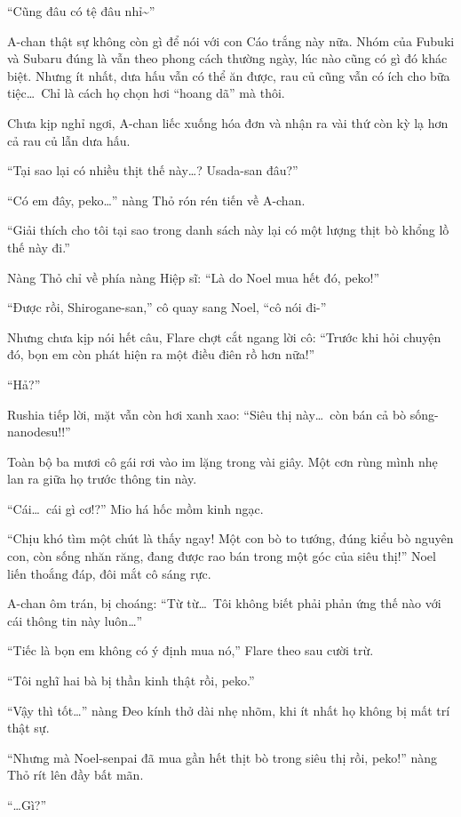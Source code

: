 \documentclass[../main.tex]{subfiles}
\begin{document}
``Cũng đâu có tệ đâu nhỉ\~{}''

A-chan thật sự không còn gì để nói với con Cáo trắng này nữa. Nhóm của Fubuki và Subaru đúng là vẫn theo phong cách thường ngày, lúc nào cũng có gì đó khác biệt. Nhưng ít nhất, dưa hấu vẫn có thể ăn được, rau củ cũng vẫn có ích cho bữa tiệc\dots\ Chỉ là cách họ chọn hơi ``hoang dã'' mà thôi.

Chưa kịp nghỉ ngơi, A-chan liếc xuống hóa đơn và nhận ra vài thứ còn kỳ lạ hơn cả rau củ lẫn dưa hấu.

``Tại sao lại có nhiều thịt thế này\dots? Usada-san đâu?''

``Có em đây, peko\dots'' nàng Thỏ rón rén tiến về A-chan.

``Giải thích cho tôi tại sao trong danh sách này lại có một lượng thịt bò khổng lồ thế này đi.''

Nàng Thỏ chỉ về phía nàng Hiệp sĩ: ``Là do Noel mua hết đó, peko!''

``Được rồi, Shirogane-san,'' cô quay sang Noel, ``cô nói đi-''

Nhưng chưa kịp nói hết câu, Flare chợt cắt ngang lời cô: ``Trước khi hỏi chuyện đó, bọn em còn phát hiện ra một điều điên rồ hơn nữa!''

``Hả?''

Rushia tiếp lời, mặt vẫn còn hơi xanh xao: ``Siêu thị này\dots\ còn bán cả bò sống-nanodesu!!''

Toàn bộ ba mươi cô gái rơi vào im lặng trong vài giây. Một cơn rùng mình nhẹ lan ra giữa họ trước thông tin này.

``Cái\dots\ cái gì cơ!?'' Mio há hốc mồm kinh ngạc.

``Chịu khó tìm một chút là thấy ngay! Một con bò to tướng, đúng kiểu bò nguyên con, còn sống nhăn răng, đang được rao bán trong một góc của siêu thị!'' Noel liến thoắng đáp, đôi mắt cô sáng rực.

A-chan ôm trán, bị choáng: ``Từ từ\dots\ Tôi không biết phải phản ứng thế nào với cái thông tin này luôn\dots''

``Tiếc là bọn em không có ý định mua nó,'' Flare theo sau cười trừ.

``Tôi nghĩ hai bà bị thần kinh thật rồi, peko.''

``Vậy thì tốt\dots'' nàng Đeo kính thở dài nhẹ nhõm, khi ít nhất họ không bị mất trí thật sự.

``Nhưng mà Noel-senpai đã mua gần hết thịt bò trong siêu thị rồi, peko!'' nàng Thỏ rít lên đầy bất mãn.

``\dots Gì?''
\end{document}
